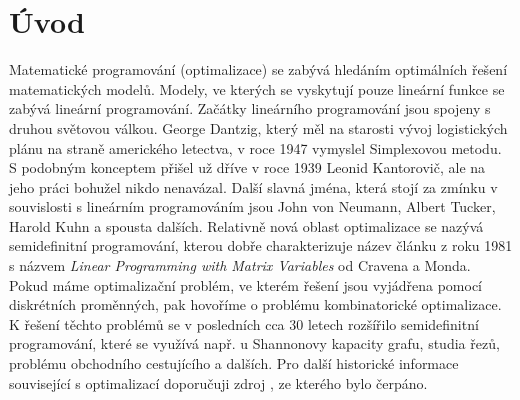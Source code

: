 \chapter*{Úvod}

Matematické programování (optimalizace) se zabývá hledáním optimálních řešení matematických modelů. Modely, ve kterých se vyskytují pouze lineární funkce se zabývá lineární programování. Začátky lineárního programování jsou spojeny s druhou světovou válkou. George Dantzig, který měl na starosti vývoj logistických plánu na straně amerického letectva, v roce 1947 vymyslel Simplexovou metodu. S podobným konceptem přišel už dříve v roce 1939 Leonid Kantorovič, ale na jeho práci bohužel nikdo nenavázal. Další slavná jména, která stojí za zmínku v souvislosti s lineárním programováním jsou John von Neumann, Albert Tucker, Harold Kuhn a spousta dalších. Relativně nová oblast optimalizace se nazývá semidefinitní programování, kterou dobře charakterizuje název článku z roku 1981 s názvem \textit{Linear Programming with Matrix Variables} od Cravena a Monda. Pokud máme optimalizační problém, ve kterém řešení jsou vyjádřena pomocí diskrétních proměnných, pak hovoříme o problému kombinatorické optimalizace. K řešení těchto problémů se v posledních cca 30 letech rozšířilo semidefinitní programování, které se využívá např. u Shannonovy kapacity grafu, studia řezů, problému obchodního cestujícího a dalších. Pro další historické informace související s optimalizací doporučuji zdroj \cite{history}, ze kterého bylo čerpáno.